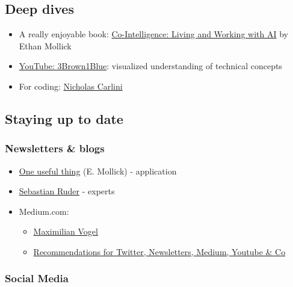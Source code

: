 \documentclass[
  letterpaper,
  DIV=11,
  numbers=noendperiod]{scrartcl}
\providecommand{\tightlist}{%
  \setlength{\itemsep}{0pt}\setlength{\parskip}{0pt}}\usepackage{longtable,booktabs,array}
\begin{document}
\subsection{Deep dives}\label{deep-dives}

\begin{itemize}
\tightlist
\item
  A really enjoyable book:
  \href{https://www.amazon.de/Co-Intelligence-Living-Working-Ethan-Mollick/dp/0753560771}{Co-Intelligence:
  Living and Working with AI} by Ethan Mollick
\item
  \href{https://www.youtube.com/@3blue1brown}{YouTube: 3Brown1Blue}:
  visualized understanding of technical concepts
\item
  For coding:
  \href{https://nicholas.carlini.com/writing/2024/how-i-use-ai.html}{Nicholas
  Carlini}
\end{itemize}

\subsection{Staying up to date}\label{staying-up-to-date}

\subsubsection{Newsletters \& blogs}\label{newsletters-blogs}

\begin{itemize}
\tightlist
\item
  \href{https://www.oneusefulthing.org/}{One useful thing} (E. Mollick)
  - application
\item
  \href{https://www.ruder.io/}{Sebastian Ruder} - experts
\item
  Medium.com:

  \begin{itemize}
  \tightlist
  \item
    \href{https://medium.com/@maximilian.vogel}{Maximilian Vogel}
  \item
    \href{https://medium.com/@maobedkova/how-i-stay-up-to-date-with-ai-and-nlp-656de9e284d9}{Recommendations
    for Twitter, Newsletters, Medium, Youtube \& Co}
  \end{itemize}
\end{itemize}

\subsubsection{Social Media}\label{social-media}
\end{document}
